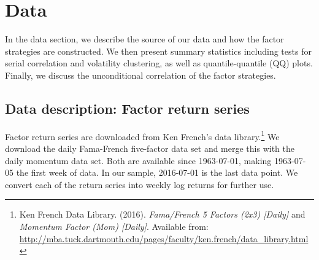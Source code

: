 \section{Data}
\label{sec:data}
In the data section, we describe the source of our data and how the factor strategies are constructed. We then present summary statistics including tests for serial correlation and volatility clustering, as well as quantile-quantile (QQ) plots. Finally, we discuss the unconditional correlation of the factor strategies.

\subsection{Data description: Factor return series}

Factor return series are downloaded from Ken French's data library.\footnote{Ken French Data Library. (2016). \textit{Fama/French 5 Factors (2x3) [Daily]} and \textit{Momentum Factor (Mom) [Daily]}. Available from: \url{http://mba.tuck.dartmouth.edu/pages/faculty/ken.french/data_library.html}} We download the daily Fama-French five-factor data set and merge this with the daily momentum data set. Both are available since 1963-07-01, making 1963-07-05 the first week of data. In our sample, 2016-07-01 is the last data point. We convert each of the return series into weekly log returns for further use. 

